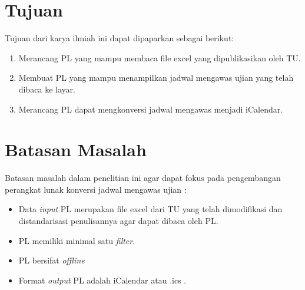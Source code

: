 \section{Tujuan}
\label{sec:tujuan}
Tujuan dari karya ilmiah ini dapat dipaparkan sebagai berikut:
\begin{enumerate}
	\item Merancang PL yang mampu membaca file excel yang dipublikasikan oleh TU.
	\item Membuat PL yang mampu menampilkan jadwal mengawas ujian yang telah dibaca ke layar.
	\item Merancang PL dapat mengkonversi jadwal mengawas menjadi iCalendar.
	
\end{enumerate}

\section{Batasan Masalah}
\label{sec:batasan_masalah}
Batasan masalah dalam penelitian ini agar dapat fokus pada pengembangan perangkat lunak konversi jadwal mengawas ujian :
\begin{itemize}
	\item Data \textit{input} PL merupakan file excel dari TU yang telah dimodifikasi dan distandarisasi penulisannya agar dapat dibaca oleh PL.
	\item PL memiliki minimal satu \textit{filter}. 
	\item PL bersifat \textit{offline} 
	\item Format \textit{output} PL adalah iCalendar atau .ics .  
\end{itemize}

